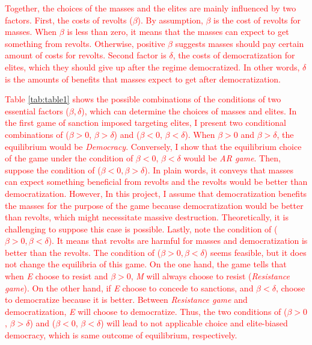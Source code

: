 \documentclass[11pt]{article}
\begin{document}


\textcolor{red}{Together, the choices of the masses and the elites are mainly influenced by two factors. First, the costs of revolts ($\beta$). By assumption, $\beta$ is the cost of revolts for masses. When $\beta$ is less than zero, it means that the masses can expect to get something from revolts. Otherwise, positive $\beta$ suggests masses should pay certain amount of costs for revolts. Second factor is $\delta$, the costs of democratization for elites, which they should give up after the regime democratized. In other words, $\delta$ is the amounts of benefits that masses expect to get after democratization.}

\textcolor{red}{Table \ref{tab:table1} shows the possible combinations of the conditions of two essential factors ($\beta, \delta$), which can determine the choices of masses and elites. In the first game of sanction imposed targeting elites, I present two conditional combinations of ($\beta > 0$, $\beta > \delta$) and ($\beta < 0$, $\beta < \delta$). When $\beta > 0$ and $\beta > \delta$, the equilibrium would be \textit{Democracy}. Conversely, I show that the equilibrium choice of the game under the condition of $\beta < 0$, $\beta < \delta$ would be \textit{AR game}. Then, suppose the condition of ($\beta < 0, \beta > \delta$). In plain words, it conveys that masses can expect something beneficial from revolts and the revolts would be better than democratization. However, In this project, I assume that democratization benefits the masses for the purpose of the game because democratization would be better than revolts, which might necessitate massive destruction. Theoretically, it is challenging to suppose this case is possible. Lastly, note the condition of ($\beta > 0, \beta < \delta$). It means that revolts are harmful for masses and democratization is better than the revolts. The condition of ($\beta > 0, \beta < \delta$) seems feasible, but it does not change the equilibria of this game. On the one hand, the game tells that when \textit{E} choose to resist and $\beta>0$,  \textit{M} will always choose to resist (\textit{Resistance game}). On the other hand, if \textit{E} choose to concede to sanctions, and $\beta < \delta$,  choose to democratize because it is better. Between \textit{Resistance game} and democratization, \textit{E} will choose to democratize. Thus, the two conditions of ($\beta > 0$, $\beta > \delta$) and ($\beta < 0$, $\beta < \delta$) will lead to not applicable choice and elite-biased democracy, which is same outcome of equilibrium, respectively.}
\end{document}
